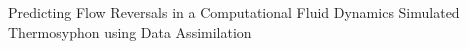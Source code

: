 Predicting Flow Reversals in a Computational Fluid Dynamics Simulated Thermosyphon using Data Assimilation
